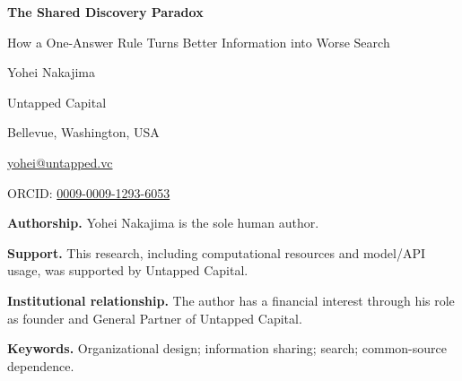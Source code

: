\documentclass[11pt]{article}
\begin{document}
\thispagestyle{empty}
\begin{center}
{\Large\bfseries The Shared Discovery Paradox}\par
{\large How a One-Answer Rule Turns Better Information into Worse Search}\par\bigskip
{\large Yohei Nakajima}\par
Untapped Capital\par
Bellevue, Washington, USA\par
\href{mailto:yohei@untapped.vc}{yohei@untapped.vc}\par
ORCID: \href{https://orcid.org/0009-0009-1293-6053}{0009-0009-1293-6053}
\end{center}
\bigskip
\noindent\textbf{Authorship.} Yohei Nakajima is the sole human author.

\noindent\textbf{Support.} This research, including computational resources and model/API usage, was supported by Untapped Capital.

\noindent\textbf{Institutional relationship.} The author has a financial interest through his role as founder and General Partner of Untapped Capital.

\noindent\textbf{Keywords.} Organizational design; information sharing; search; common-source dependence.
\end{document}
